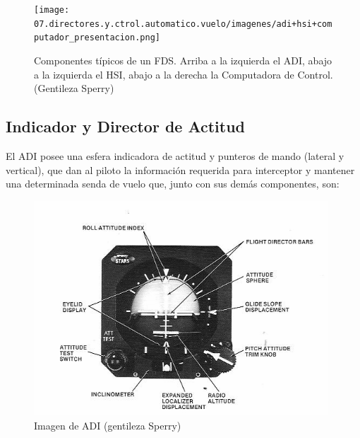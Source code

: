 \begin{figure}[!h]
  \centering
    \texttt{[image: 07.directores.y.ctrol.automatico.vuelo/imagenes/adi+hsi+computador\_presentacion.png]}  
  \caption{Componentes t\'ipicos de un \ac{FDS}. Arriba a la izquierda el ADI, abajo a la izquierda el HSI, abajo a la derecha la Computadora de Control. (Gentileza Sperry) }
  \label{fig:07.componentes.tipico.FDS.sperry-STARS}
\end{figure}


\subsection{Indicador y Director de Actitud }
\label{sec:adi}

El \ac{ADI} 
 posee una esfera indicadora de actitud y punteros de 
mando (lateral y vertical), que dan al piloto la informaci\'on requerida
para interceptor y mantener una determinada senda de vuelo que, junto
con sus dem\'as componentes, son:

\begin{figure}[!h]\centering
  \includegraphics[width=0.98\textwidth]{07.directores.y.ctrol.automatico.vuelo/imagenes/adi.png}
  \caption{Imagen de ADI (gentileza Sperry)}
\label{fig:07.adi.sperry}
\end{figure}

